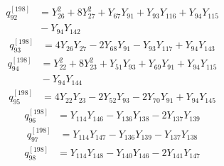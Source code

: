 \begin{equation}\label{q198:row:092}
\begin{aligned}
q_{92}^{[198]} &={} Y_{26}^{2} + 8Y_{27}^{2} + Y_{67}Y_{91} + Y_{93}Y_{116} + Y_{94}Y_{115}\\
&{} - Y_{94}Y_{142}
\end{aligned}
\end{equation}
\begin{equation}\label{q198:row:093}
\begin{aligned}
q_{93}^{[198]} &={} 4Y_{26}Y_{27} - 2Y_{68}Y_{91} - Y_{93}Y_{117} + Y_{94}Y_{143}
\end{aligned}
\end{equation}
\begin{equation}\label{q198:row:094}
\begin{aligned}
q_{94}^{[198]} &={} Y_{22}^{2} + 8Y_{23}^{2} + Y_{51}Y_{93} + Y_{69}Y_{91} + Y_{94}Y_{115}\\
&{} - Y_{94}Y_{144}
\end{aligned}
\end{equation}
\begin{equation}\label{q198:row:095}
\begin{aligned}
q_{95}^{[198]} &={} 4Y_{22}Y_{23} - 2Y_{52}Y_{93} - 2Y_{70}Y_{91} + Y_{94}Y_{145}
\end{aligned}
\end{equation}
\begin{equation}\label{q198:row:096}
\begin{aligned}
q_{96}^{[198]} &={} Y_{114}Y_{146} - Y_{136}Y_{138} - 2Y_{137}Y_{139}
\end{aligned}
\end{equation}
\begin{equation}\label{q198:row:097}
\begin{aligned}
q_{97}^{[198]} &={} Y_{114}Y_{147} - Y_{136}Y_{139} - Y_{137}Y_{138}
\end{aligned}
\end{equation}
\begin{equation}\label{q198:row:098}
\begin{aligned}
q_{98}^{[198]} &={} Y_{114}Y_{148} - Y_{140}Y_{146} - 2Y_{141}Y_{147}
\end{aligned}
\end{equation}
